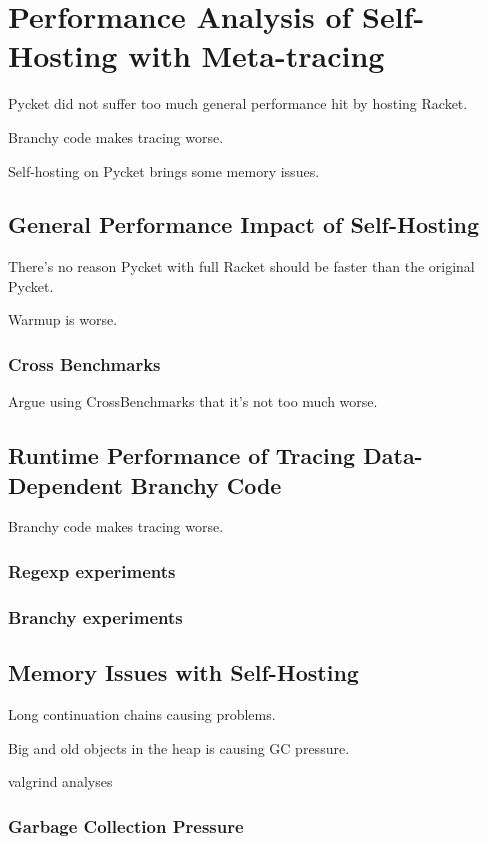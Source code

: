 \chapter{Performance Analysis of Self-Hosting with Meta-tracing}

	\begin{chapterpoint}
		Pycket did not suffer too much general performance hit by hosting Racket.

		Branchy code makes tracing worse.

		Self-hosting on Pycket brings some memory issues.
	\end{chapterpoint}

	\section{General Performance Impact of Self-Hosting}
	
		\begin{mainpoint}
			There's no reason Pycket with full Racket should be faster than the original Pycket.

			Warmup is worse.
		\end{mainpoint}

		\subsection{Cross Benchmarks}

			\begin{mainpoint}
				Argue using CrossBenchmarks that it's not too much worse.
			\end{mainpoint}

	\section{Runtime Performance of Tracing Data-Dependent Branchy Code}
		\begin{mainpoint}
			Branchy code makes tracing worse.
		\end{mainpoint}

		\subsection{Regexp experiments}
		\subsection{Branchy experiments}

	\section{Memory Issues with Self-Hosting}
		\begin{mainpoint}
			Long continuation chains causing problems.

			Big and old objects in the heap is causing GC pressure.
		\end{mainpoint}
		
		valgrind analyses

		\subsection{Garbage Collection Pressure}
